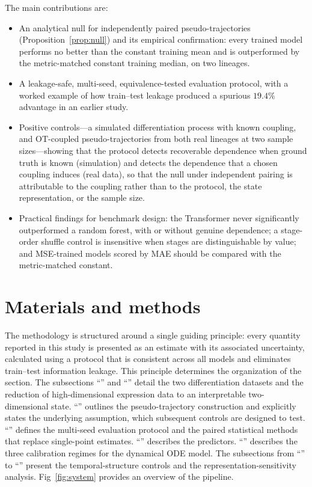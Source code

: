 \documentclass[10pt,letterpaper]{article}
\begin{document}
The main contributions are:
\begin{itemize}
    \item An analytical null for independently paired pseudo-trajectories (Proposition~\ref{prop:null}) and its empirical confirmation: every trained model performs no better than the constant training mean and is outperformed by the metric-matched constant training median, on two lineages.
    \item A leakage-safe, multi-seed, equivalence-tested evaluation protocol, with a worked example of how train--test leakage produced a spurious $19.4\%$ advantage in an earlier study.
    \item Positive controls---a simulated differentiation process with known coupling, and OT-coupled pseudo-trajectories from both real lineages at two sample sizes---showing that the protocol detects recoverable dependence when ground truth is known (simulation) and detects the dependence that a chosen coupling induces (real data), so that the null under independent pairing is attributable to the coupling rather than to the protocol, the state representation, or the sample size.
    \item Practical findings for benchmark design: the Transformer never significantly outperformed a random forest, with or without genuine dependence; a stage-order shuffle control is insensitive when stages are distinguishable by value; and MSE-trained models scored by MAE should be compared with the metric-matched constant.
\end{itemize}


\section*{Materials and methods}
\label{sec:methods}
The methodology is structured around a single guiding principle: every quantity reported in this study is presented as an estimate with its associated uncertainty, calculated using a protocol that is consistent across all models and eliminates train--test information leakage. This principle determines the organization of the section. The subsections ``'' and ``'' detail the two differentiation datasets and the reduction of high-dimensional expression data to an interpretable two-dimensional state. ``'' outlines the pseudo-trajectory construction and explicitly states the underlying assumption, which subsequent controls are designed to test. ``'' defines the multi-seed evaluation protocol and the paired statistical methods that replace single-point estimates. ``'' describes the predictors. ``'' describes the three calibration regimes for the dynamical ODE model. The subsections from ``'' to ``'' present the temporal-structure controls and the representation-sensitivity analysis. Fig~\ref{fig:system} provides an overview of the pipeline.
\end{document}

